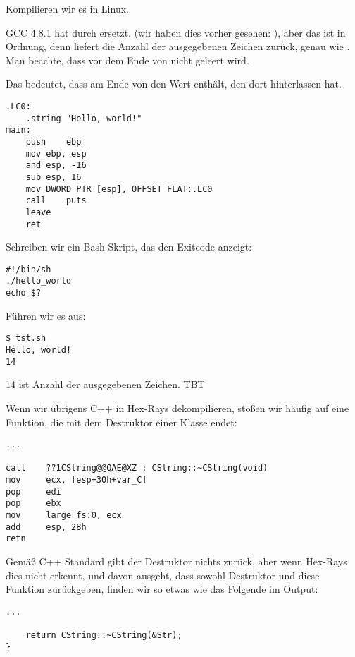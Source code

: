 Kompilieren wir es in Linux.

GCC 4.8.1 hat \printf durch \puts ersetzt. 
(wir haben dies vorher gesehen: ), aber das ist in Ordnung,
denn \puts liefert die Anzahl der ausgegebenen Zeichen zurück, genau wie \printf.
Man beachte, dass \EAX vor dem Ende von \main nicht geleert wird.

Das bedeutet, dass \EAX am Ende von \main den Wert enthält, den \puts dort hinterlassen hat.

\begin{lstlisting}[caption=GCC 4.8.1,style=customasmx86]
.LC0:
	.string	"Hello, world!"
main:
	push	ebp
	mov	ebp, esp
	and	esp, -16
	sub	esp, 16
	mov	DWORD PTR [esp], OFFSET FLAT:.LC0
	call	puts
	leave
	ret
\end{lstlisting}


Schreiben wir ein Bash Skript, das den Exitcode anzeigt:

\begin{lstlisting}[caption=tst.sh]
#!/bin/sh
./hello_world
echo $?
\end{lstlisting}

Führen wir es aus:

\begin{lstlisting}
$ tst.sh 
Hello, world!
14
\end{lstlisting}

14 ist Anzahl der ausgegebenen Zeichen.
\ac{TBT}

Wenn wir übrigens C++ in Hex-Rays dekompilieren, stoßen wir häufig auf eine Funktion, die mit dem Destruktor einer
Klasse endet:

\begin{lstlisting}[style=customasmx86]
...

call    ??1CString@@QAE@XZ ; CString::~CString(void)
mov     ecx, [esp+30h+var_C]
pop     edi
pop     ebx
mov     large fs:0, ecx
add     esp, 28h
retn
\end{lstlisting}
Gemäß C++ Standard gibt der Destruktor nichts zurück, aber wenn Hex-Rays dies nicht erkennt, und davon ausgeht, dass
sowohl Destruktor und diese Funktion \Tint zurückgeben, finden wir so etwas wie das Folgende im Output:

\begin{lstlisting}[style=customc]
...

	return CString::~CString(&Str);
}
\end{lstlisting}

